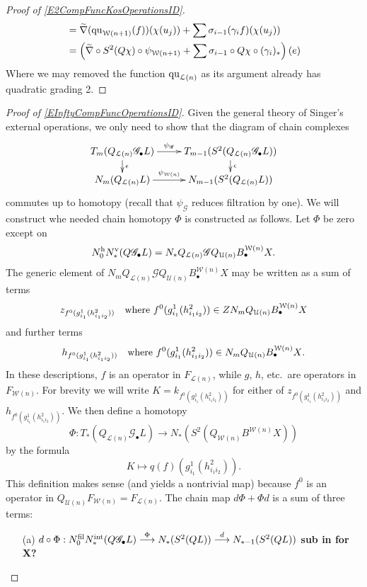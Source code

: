 \documentclass[11pt]{amsart}
\theoremstyle{plain}
\theoremstyle{definition}
\renewcommand{\to}{\longrightarrow}
\newcommand{\squishlist}{
  \setlength{\itemsep}{.5pt}
  \setlength{\parskip}{0pt}
  \setlength{\parsep}{0pt}}
\newcommand{\scrQ}{\mathscr{Q}}
\newcommand{\scrR}{\mathscr{R}}
\newcommand{\scrT}{\mathscr{T}}
\newcommand{\scrY}{\mathscr{Y}}
\newcommand{\scrI}{\mathscr{I}}
\newcommand{\scrO}{\mathscr{O}}
\newcommand{\scrP}{\mathscr{P}}
\newcommand{\scrS}{\mathscr{S}}
\newcommand{\scrG}{\mathscr{G}}
\newcommand{\scrH}{\mathscr{H}}
\newcommand{\scrJ}{\mathscr{J}}
\newcommand{\scrK}{\mathscr{K}}
\newcommand{\scrL}{\mathscr{L}}
\newcommand{\scrZ}{\mathscr{Z}}
\newcommand{\scrN}{\mathscr{N}}
\newcommand{\scrM}{\mathscr{M}}
\newcommand{\calW}{\mathcal{W}}
\newcommand{\calU}{\mathcal{U}}
\newcommand{\calL}{\mathcal{L}}
\theoremstyle{plain}
\newcommand{\BSW}{{\scrG}}%
\newcommand{\BSWres}{{\scrG_\bullet}}
\newcommand{\quadratic}{\textup{qu}}
\begin{document}
\begin{Composite functor spectral sequences}
\begin{proof}[Proof of \ref{E2CompFuncKosOperationsID}]
\begin{alignat*}{2}
&=\widetilde{\nabla}(\quadratic_{\calW(n+1)}(f))(\chi(u_j))+\sum \sigma_{i-1}(\gamma_if)(\chi(u_j))\\
&=\left(\widetilde{\nabla}\circ S^2(Q\chi)\circ \psi_{\calW(n+1)}+\sum\sigma_{i-1}\circ Q\chi\circ(\gamma_i)_*\right)(e)
\end{alignat*}
Where we may removed the function $\quadratic_{\calL(n)}$ as its argument already has quadratic grading 2.
\end{proof}

\begin{proof}[Proof of \ref{EInftyCompFuncOperationsID}]
Given the general theory of Singer's external operations, we only need to show that the diagram of chain complexes
\[\xymatrix@R=4mm{
T_{m}(Q_{\calL(n)}\BSWres L)
\ar[r]^-{\psi_{\BSW}}
\ar[d]^-{\epsilon}
&%
T_{m-1}(S^2(Q_{\calL(n)}\BSWres L))\ar[d]^-{\epsilon}
\\%
N_{m}(Q_{\calL(n)}L)
\ar[r]^-{\psi_{\calW(n)}}
&%
N_{m-1}(S^2(Q_{\calL(n)} L))
}\]
commutes up to homotopy (recall that $\psi_{\BSW}$ reduces filtration by one). We will construct whe needed chain homotopy $\Phi$ is constructed as follows. Let $\Phi$ be zero except on 
\[N_0^\textup{h}N_*^\textup{v}(Q\BSWres L)=N_*Q_{\calL(n)}\BSW Q_{\calU(n)}B_\bullet^{\calW(n)}X.\]
The generic element of $N_mQ_{\calL(n)}\BSW Q_{\calU(n)}B_\bullet^{\calW(n)}X$ may be written as a sum of terms
\[z_{f^0(g^1_{i_1}(h^2_{i_1i_2}))}\textup{\quad where $f^0(g^1_{i_1}(h^2_{i_1i_2}))\in ZN_m Q_{\calU(n)}B_\bullet^{\calW(n)}X$}\]
and further terms
\[h_{f^0(g^1_{i_1}(h^2_{i_1i_2}))}\textup{\quad where $f^0(g^1_{i_1}(h^2_{i_1i_2}))\in N_{m} Q_{\calU(n)}B_\bullet^{\calW(n)}X$}.\]
In these descriptions, $f$ is an operator in $F_{\calL(n)}$, while $g$, $h$, etc.\ are operators in $F_{\calW(n)}$.
For brevity we will write $K=k_{f^0(g^1_{i_1}(h^2_{i_1i_2}))}$ for either of $z_{f^0(g^1_{i_1}(h^2_{i_1i_2}))}$ and $h_{f^0(g^1_{i_1}(h^2_{i_1i_2}))}$.
We then define a homotopy 
\[\Phi:T_*(Q_{\calL(n)}\BSWres L)\to N_*(S^2(Q_{\calW(n)}B^{\calW(n)}X))\]
by the formula
\[K\mapsto q(f)(g^1_{i_1}(h^2_{i_1i_2})).\]
This definition makes sense (and yields a nontrivial map) because $f^0$ is an operator in $Q_{\calU(n)}F_{\calW(n)}=F_{\calL(n)}$.
The chain map $d\Phi+\Phi d$ is a sum of three terms:
\begin{enumerate}\squishlist
\setlength{\parindent}{.25in}
\item[(a)] $d\circ\Phi:N_0^\textup{fil}N_*^\textup{int}(Q\BSWres L)\overset{\Phi}{\to} N_*(S^2(QL))\overset{d}{\to} N_{*-1}(S^2(QL))$ \textbf{sub in for X?}

\end{enumerate}
\end{proof}
\end{Composite functor spectral sequences}
\end{document}
